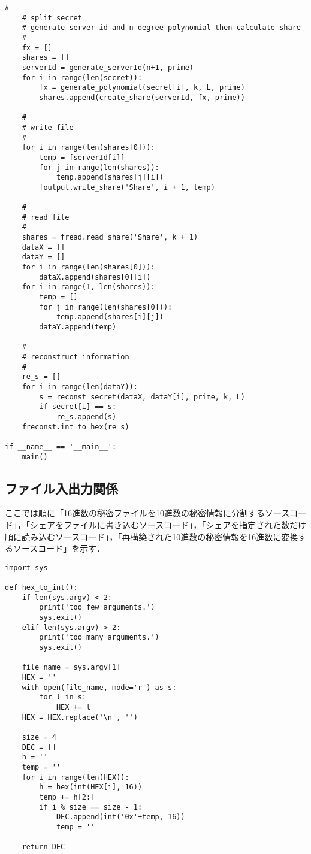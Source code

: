 \documentclass[10pt, a4paper, titlepage]{jsreport}
\begin{document}
\begin{lstlisting}[caption=RampSecretSharing.py, label=RSS]
    #
    # split secret
    # generate server id and n degree polynomial then calculate share
    #
    fx = []
    shares = []
    serverId = generate_serverId(n+1, prime)
    for i in range(len(secret)):
        fx = generate_polynomial(secret[i], k, L, prime)
        shares.append(create_share(serverId, fx, prime))

    #
    # write file
    #
    for i in range(len(shares[0])):
        temp = [serverId[i]]
        for j in range(len(shares)):
            temp.append(shares[j][i])
        foutput.write_share('Share', i + 1, temp)

    #
    # read file
    #
    shares = fread.read_share('Share', k + 1)
    dataX = []
    dataY = []
    for i in range(len(shares[0])):
        dataX.append(shares[0][i])
    for i in range(1, len(shares)):
        temp = []
        for j in range(len(shares[0])):
            temp.append(shares[i][j])
        dataY.append(temp)
    
    #
    # reconstruct information
    #
    re_s = []
    for i in range(len(dataY)):
        s = reconst_secret(dataX, dataY[i], prime, k, L)
        if secret[i] == s:
            re_s.append(s)
    freconst.int_to_hex(re_s)

if __name__ == '__main__':
    main()
	\end{lstlisting}

	\subsection{ファイル入出力関係}
	ここでは順に「16進数の秘密ファイルを10進数の秘密情報に分割するソースコード」，「シェアをファイルに書き込むソースコード」，「シェアを指定された数だけ順に読み込むソースコード」，「再構築された10進数の秘密情報を16進数に変換するソースコード」を示す．

	\begin{lstlisting}[caption=file\_split.py, label=split]
import sys

def hex_to_int():
    if len(sys.argv) < 2:
        print('too few arguments.')
        sys.exit()
    elif len(sys.argv) > 2:
        print('too many arguments.')
        sys.exit()

    file_name = sys.argv[1]
    HEX = ''
    with open(file_name, mode='r') as s:
        for l in s:
            HEX += l
    HEX = HEX.replace('\n', '')

    size = 4
    DEC = []
    h = ''
    temp = ''
    for i in range(len(HEX)):
        h = hex(int(HEX[i], 16))
        temp += h[2:]
        if i % size == size - 1:
            DEC.append(int('0x'+temp, 16))
            temp = ''

    return DEC
	\end{lstlisting}
\end{document}
